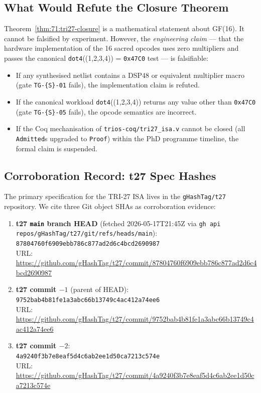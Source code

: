 \subsection{What Would Refute the Closure Theorem}
\label{subsec:71:what-refutes}

Theorem~\ref{thm:71:tri27-closure} is a mathematical statement about
GF(16).  It cannot be falsified by experiment.  However, the
\emph{engineering claim} — that the hardware implementation of the
16 sacred opcodes uses zero multipliers and passes the canonical
\texttt{dot4}((1,2,3,4)) = \texttt{0x47C0} test — is falsifiable:

\begin{itemize}
  \item If any synthesised netlist contains a DSP48 or equivalent
    multiplier macro (gate \texttt{TG-\{S\}-01} fails), the
    implementation claim is refuted.
  \item If the canonical workload \texttt{dot4}((1,2,3,4)) returns any
    value other than \texttt{0x47C0} (gate \texttt{TG-\{S\}-05} fails),
    the opcode semantics are incorrect.
  \item If the Coq mechanisation of
    \texttt{trios-coq/tri27\_isa.v} cannot be closed
    (all \texttt{Admitted}s upgraded to \texttt{Proof}) within the
    PhD programme timeline, the formal claim is suspended.
\end{itemize}

\subsection{Corroboration Record: t27 Spec Hashes}
\label{subsec:71:corroboration}

The primary specification for the TRI-27 ISA lives in the
\texttt{gHashTag/t27} repository.  We cite three Git object SHAs
as corroboration evidence:

\begin{enumerate}
  \item \textbf{t27 \texttt{main} branch HEAD} (fetched
    2026-05-17T21:45Z via
    \texttt{gh api repos/gHashTag/t27/git/refs/heads/main}): \\
    \texttt{87804760f6909ebb786c877ad2d6c4bcd2690987} \\
    URL: \url{https://github.com/gHashTag/t27/commit/87804760f6909ebb786c877ad2d6c4bcd2690987}

  \item \textbf{t27 commit $-1$} (parent of HEAD): \\
    \texttt{9752bab4b81fe1a3abc66b13749c4ac412a74ee6} \\
    URL: \url{https://github.com/gHashTag/t27/commit/9752bab4b81fe1a3abc66b13749c4ac412a74ee6}

  \item \textbf{t27 commit $-2$}: \\
    \texttt{4a9240f3b7e8eaf5d4c6ab2ee1d50ca7213c574e} \\
    URL: \url{https://github.com/gHashTag/t27/commit/4a9240f3b7e8eaf5d4c6ab2ee1d50ca7213c574e}
\end{enumerate}

